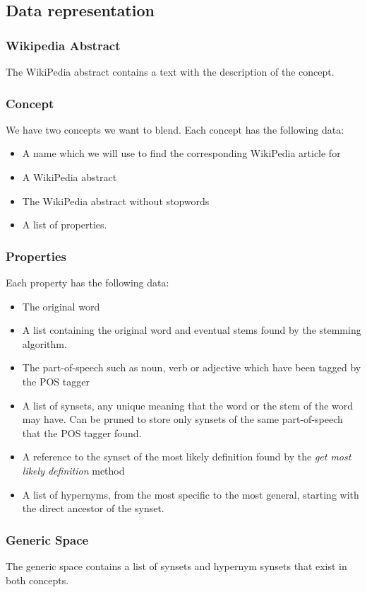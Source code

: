 \subsection{Data representation}

\subsubsection{Wikipedia Abstract}
The WikiPedia abstract contains a text with the description of the concept.

\subsubsection{Concept}
We have two concepts we want to blend. Each concept has the following data:
\begin{itemize}
\item A name which we will use to find the corresponding WikiPedia article for
\item A WikiPedia abstract
\item The WikiPedia abstract without stopwords
\item A list of properties.
\end{itemize}

\subsubsection{Properties}
Each property has the following data:
\begin{itemize}
\item The original word
\item A list containing the original word and eventual stems found by the stemming algorithm.
\item The part-of-speech such as noun, verb or adjective which have been tagged by the POS tagger
\item A list of synsets, any unique meaning that the word or the stem of the word may have. Can be pruned to store only synsets of the same part-of-speech that the POS tagger found.
\item A reference to the synset of the most likely definition found by the \emph{get most likely definition} method
\item A list of hypernyms, from the most specific to the most general, starting with the direct ancestor of the synset.
\end{itemize}

\subsubsection{Generic Space}
The generic space contains a list of synsets and hypernym synsets that exist in both concepts.

